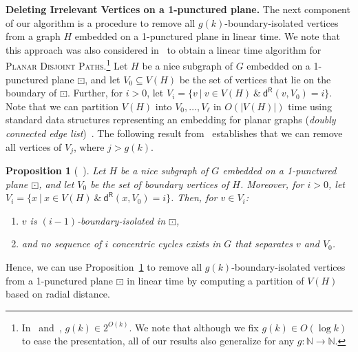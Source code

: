 \documentclass{article}
\newtheorem{proposition}[theorem]{Proposition}
\numberwithin{claimcounter}{lemma}
\begin{document}
\medskip
\noindent \textbf{Deleting Irrelevant Vertices on a 1-punctured plane.}
The next component of our algorithm is a procedure to remove all $g(k)$-boundary-isolated vertices from a graph $H$ embedded on a 1-punctured plane in linear time. We note that this approach was also considered in~\cite{cho2023parameterized} to obtain a linear time algorithm for \textsc{Planar Disjoint Paths}.\footnote{In~\cite{cho2023parameterized} and~\cite{reedLinear}, $g(k) \in 2^{O(k)}$. We note that although we fix $g(k)\in O(\log k)$ to ease the presentation, all of our results also generalize for any $g:\mathbb{N}\rightarrow\mathbb{N}$.}
Let $H$ be a nice subgraph of $G$ embedded on a 1-punctured plane $\boxdot$, and let $V_0\subseteq V(H)$ be the set of vertices that lie on the boundary of $\boxdot$. Further, for $i>0$, let $V_i = \{v~|~ v\in V(H) ~\& ~{\mathsf{d^R}}(v,V_0) = i\}$. Note that we can partition $V(H)$ into  $V_0, \ldots, V_{\ell}$ in $O(|V(H)|)$ time  using standard data structures representing an embedding for planar graphs (\textit{doubly connected edge list})~\cite{CGBook}. The following result from~\cite{cho2023parameterized} establishes that we can remove all vertices of $V_{j}$, where  $j > g(k)$.
\begin{proposition}[~\cite{cho2023parameterized}]\label{P:oneFace}
    Let $H$ be a nice subgraph of $G$ embedded on a 1-punctured plane $\boxdot$, and let $V_0$ be the set of boundary vertices of $H$. Moreover, for $i>0$, let $V_i= \{x~|~ x\in V(H)~\&~ \mathsf{d^R}(x,V_0) =i\}$. Then, for $v\in V_i$:
    \begin{enumerate}
        \item $v$ is $(i-1)$-boundary-isolated in $\boxdot$,
        \item and no sequence of $i$ concentric cycles exists in $G$ that separates $v$ and $V_0$.
    \end{enumerate}
\end{proposition}

Hence, we can use Proposition~\ref{P:oneFace} to remove all $g(k)$-boundary-isolated vertices from a 1-punctured plane $\boxdot$ in linear time by computing a partition of $V(H)$ based on radial distance. 
\end{document}
